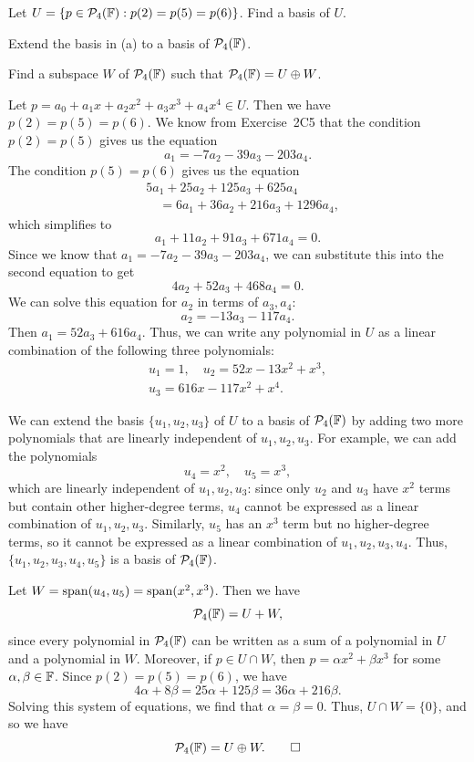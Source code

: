 \begin{exc}
\begin{exercise}\leavevmode
\begin{parts}
\item Let $U=\{p\in\mathcal{P}_4(\mathbb{F}) : p(2)=p(5)=p(6)\}$. Find a basis of $U$.
\item Extend the basis in (a) to a basis of $\mathcal{P}_4(\mathbb{F})$.
\item Find a subspace $W$ of $\mathcal{P}_4(\mathbb{F})$ such that $\mathcal{P}_4(\mathbb{F})=U\oplus W$.
\end{parts}
\end{exercise}
\begin{solution}
\begin{parts}
\item Let $p=a_0+a_1x+a_2x^2+a_3x^3+a_4x^4\in U$. Then we have
  $p(2)=p(5)=p(6)$. We know from Exercise~2C5 that the condition $p(2)=p(5)$
  gives us the equation
  \[ a_1 = -7a_2-39a_3-203a_4. \]
  The condition $p(5)=p(6)$ gives us the equation
  \begin{align*}
  &5a_1+25a_2+125a_3+625a_4\\
  &\quad= 6a_1+36a_2+216a_3+1296a_4,
  \end{align*}
  which simplifies to
  \[ a_1+11a_2+91a_3+671a_4 = 0. \]
  Since we know that $a_1=-7a_2-39a_3-203a_4$, we can substitute this into the
  second equation to get
  \[ 4a_2+52a_3+468a_4 = 0. \]
  We can solve this equation for $a_2$ in terms of $a_3,a_4$:
  \[ a_2 = -13a_3-117a_4. \]
  Then $a_1=52a_3+616a_4$. Thus, we can write any polynomial in $U$ as a linear
  combination of the following three polynomials:
  \begin{gather*}
  u_1=1, \quad u_2=52x-13x^2+x^3,\\
  u_3=616x-117x^2+x^4.
  \end{gather*}
\item We can extend the basis $\{u_1,u_2,u_3\}$ of $U$ to a basis of
  $\mathcal{P}_4(\mathbb{F})$ by adding two more polynomials that are linearly independent of
  $u_1,u_2,u_3$. For example, we can add the polynomials
  \[ u_4=x^2, \quad u_5=x^3, \]
  which are linearly independent of $u_1,u_2,u_3$: since only $u_2$ and $u_3$
  have $x^2$ terms but contain other higher-degree terms, $u_4$ cannot be
  expressed as a linear combination of $u_1,u_2,u_3$. Similarly, $u_5$ has an
  $x^3$ term but no higher-degree terms, so it cannot be expressed as a linear
  combination of $u_1,u_2,u_3,u_4$. Thus, $\{u_1,u_2,u_3,u_4,u_5\}$ is a basis
  of $\mathcal{P}_4(\mathbb{F})$.
\item Let $W=\operatorname{span}(u_4,u_5)=\operatorname{span}(x^2,x^3)$. Then we have
  \[ \mathcal{P}_4(\mathbb{F}) = U+W, \]
  since every polynomial in $\mathcal{P}_4(\mathbb{F})$ can be written as a sum of a
  polynomial in $U$ and a polynomial in $W$. Moreover, if $p\in U\cap W$, then
  $p=\alpha x^2+\beta x^3$ for some $\alpha,\beta\in\mathbb{F}$. Since
  $p(2)=p(5)=p(6)$, we have
  \[ 4\alpha+8\beta = 25\alpha+125\beta = 36\alpha+216\beta. \]
  Solving this system of equations, we find that $\alpha=\beta=0$. Thus,
  $U\cap W=\{0\}$, and so we have
  \[ \mathcal{P}_4(\mathbb{F}) = U\oplus W. \qedhere \]
\end{parts}
\end{solution}


\end{exc}
